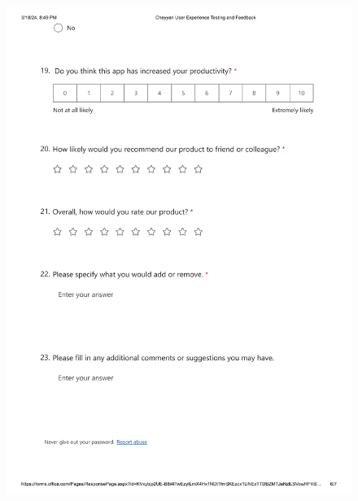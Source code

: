 \documentclass{l4proj}
\begin{document}
\begin{appendices}
\begin{figure}[h]
    \centering
    \includegraphics[height=20cm]{images/Cheyyan User Experience Testing and Feedback-6.png}
\end{figure}










\end{appendices}
\end{document}
